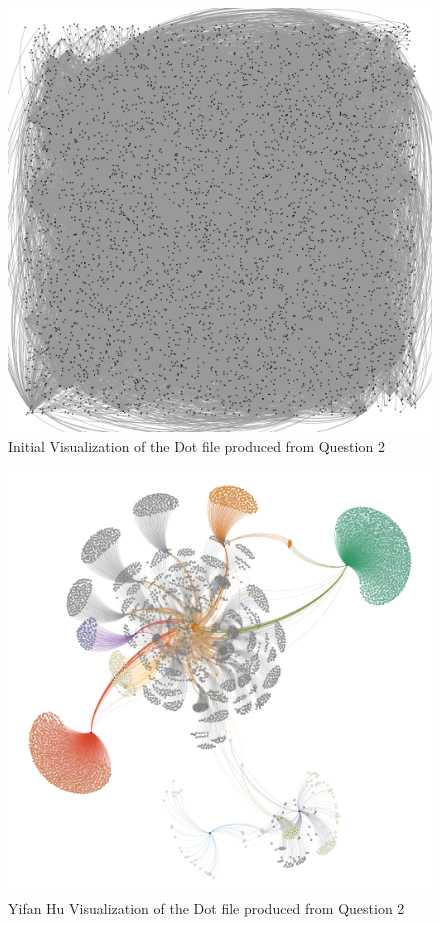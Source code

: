 \documentclass[letterpaper,11pt]{article}
\begin{document}
\begin{figure}[p]
\includegraphics[scale=0.3]{q3/Visualized/visualized.png}
\caption{Initial Visualization of the Dot file produced from Question 2}
\label{fig:q3vis-hairball}
\end{figure}

\begin{figure}[p]
\includegraphics[scale=0.4]{q3/Visualized/colorized-yifan-hu-visualized.png}
\caption{Yifan Hu Visualization of the Dot file produced from Question 2}
\label{fig:q3vis-yifan-hu}
\end{figure}
\end{document}
